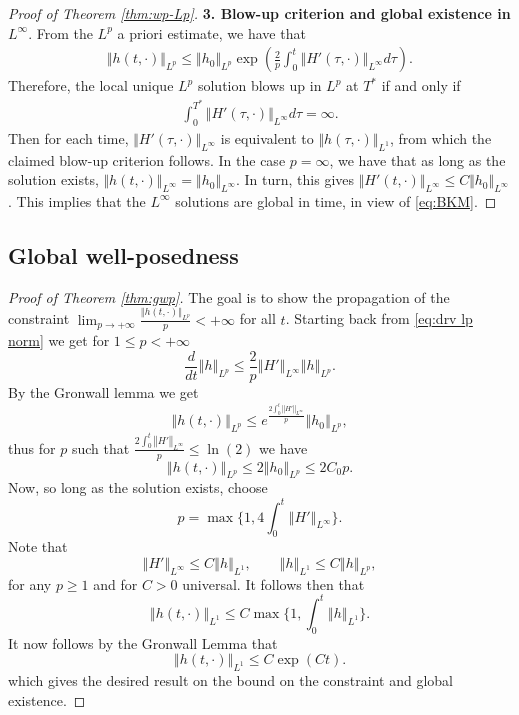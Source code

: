\documentclass[10pt]{article}
\theoremstyle{definition}
\theoremstyle{remark}
\numberwithin{equation}{section}
\newcommand{\nrm}[1]{\Vert#1\Vert}
\newcommand{\0}{\emptyset}
\begin{document}
\begin{proof}[Proof of Theorem \ref{thm:wp-Lp}]
		\noindent \textbf{3. Blow-up criterion and global existence in $L^\infty$}. From the $L^p$ a priori estimate, we have that \begin{equation*}
			\begin{split}
				\nrm{h(t,\cdot)}_{L^p} \le \nrm{h_0}_{L^p} \exp\left( \frac{2}{p} \int_0^t \nrm{H'(\tau,\cdot)}_{L^\infty} d\tau \right). 
			\end{split}
		\end{equation*} Therefore, the local unique $L^p$ solution blows up in $L^p$ at $T^*$ if and only if \begin{equation}\label{eq:BKM}
			\begin{split}
				\int_0^{T^*}\nrm{H'(\tau,\cdot)}_{L^\infty} d\tau=\infty.
			\end{split}
		\end{equation} Then for each time, $\nrm{H'(\tau,\cdot)}_{L^\infty}$ is equivalent to $\nrm{h(\tau,\cdot)}_{L^1}$, from which the claimed blow-up criterion follows. In the case $p=\infty$, we have that as long as the solution exists, $\nrm{h(t,\cdot)}_{L^\infty} = \nrm{h_0}_{L^\infty}$. In turn, this gives $\nrm{H'(t,\cdot)}_{L^\infty} \le C\nrm{h_0}_{L^\infty}$. This implies that the $L^\infty$ solutions are global in time, in view of \eqref{eq:BKM}. 
	\end{proof}
	
	\subsection{Global well-posedness}

 \begin{proof}[Proof of Theorem \ref{thm:gwp}]
     The goal is to show the propagation of the constraint $\lim_{p\rightarrow+\infty}\frac{\left \Vert h(t,\cdot)\right\Vert_{L^p}}{p}<+\infty$ for all $t$. Starting back from \eqref{eq:drv lp norm} we get for $1\leq p<+\infty$
	\[
	\frac{d}{dt}\left\Vert h\right\Vert_{L^{p}}\leq \frac{2}{p}\left\Vert H'\right\Vert_{L^{\infty}}\left\Vert h\right\Vert_{L^{p}}.
	\]
	By the Gronwall lemma we get
	\[
	\left\Vert h(t,\cdot)\right\Vert_{L^{p}}\leq e^{\frac{2\int_0^t\left\Vert H'\right\Vert_{L^{\infty}}}{p}}\left\Vert h_0\right\Vert_{L^{p}},
	\]
	thus for $p$ such that $\frac{2\int_0^t\left\Vert H'\right\Vert_{L^{\infty}}}{p}\leq \ln(2)$ we have 
	\[
	\left\Vert h(t,\cdot)\right\Vert_{L^{p}}\leq 2 \left\Vert h_0\right\Vert_{L^{p}}\leq 2C_0 p.
	\] 
	Now, so long as the solution exists, choose \[p=\max\{1,4\int_0^t \left\Vert H'\right\Vert_{L^\infty}\}.\] Note that \[\left\Vert H' \right\Vert_{L^\infty}\leq C \left\Vert h\right\Vert_{L^1},\qquad \left\Vert h\right\Vert_{L^1}\leq C\left\Vert h\right\Vert_{L^{p}},\] for any $p\geq 1$ and for $C>0$ universal. 
	It follows then that 
	\[\left\Vert h(t,\cdot)\right\Vert_{L^1}\leq C \max\{1,\int_{0}^t\left\Vert h\right\Vert_{L^1}\}.\]
	It now follows by the Gronwall Lemma that 
	\[\left\Vert h(t,\cdot)\right\Vert_{L^1}\leq C\exp(Ct).\]
	which gives the desired result on the bound on the constraint and global existence.
 \end{proof}
	
\end{document}
